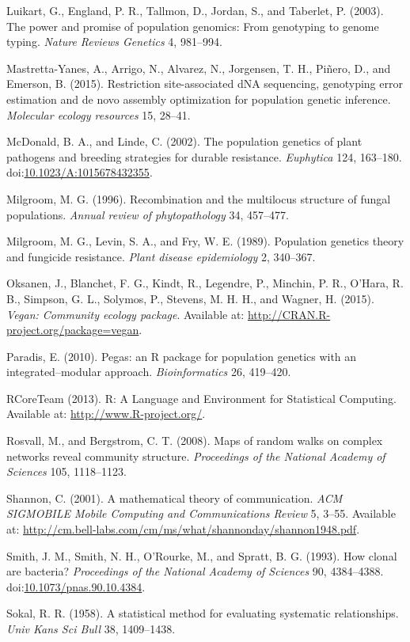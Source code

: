 \documentclass{frontiersSCNS} %
\begin{document}
Luikart, G., England, P. R., Tallmon, D., Jordan, S., and Taberlet, P.
(2003). The power and promise of population genomics: From genotyping to
genome typing. \emph{Nature Reviews Genetics} 4, 981--994.

Mastretta-Yanes, A., Arrigo, N., Alvarez, N., Jorgensen, T. H.,
Pi{ñ}ero, D., and Emerson, B. (2015). Restriction site-associated dNA
sequencing, genotyping error estimation and de novo assembly
optimization for population genetic inference. \emph{Molecular ecology
resources} 15, 28--41.

McDonald, B. A., and Linde, C. (2002). The population genetics of plant
pathogens and breeding strategies for durable resistance.
\emph{Euphytica} 124, 163--180.
doi:\href{http://dx.doi.org/10.1023/A:1015678432355}{10.1023/A:1015678432355}.

Milgroom, M. G. (1996). Recombination and the multilocus structure of
fungal populations. \emph{Annual review of phytopathology} 34, 457--477.

Milgroom, M. G., Levin, S. A., and Fry, W. E. (1989). Population
genetics theory and fungicide resistance. \emph{Plant disease
epidemiology} 2, 340--367.

Oksanen, J., Blanchet, F. G., Kindt, R., Legendre, P., Minchin, P. R.,
O'Hara, R. B., Simpson, G. L., Solymos, P., Stevens, M. H. H., and
Wagner, H. (2015). \emph{Vegan: Community ecology package}. Available
at: \url{http://CRAN.R-project.org/package=vegan}.

Paradis, E. (2010). Pegas: an R package for population genetics with an
integrated--modular approach. \emph{Bioinformatics} 26, 419--420.

RCoreTeam (2013). R: A Language and Environment for Statistical
Computing. Available at: \url{http://www.R-project.org/}.

Rosvall, M., and Bergstrom, C. T. (2008). Maps of random walks on
complex networks reveal community structure. \emph{Proceedings of the
National Academy of Sciences} 105, 1118--1123.

Shannon, C. (2001). A mathematical theory of communication. \emph{ACM
SIGMOBILE Mobile Computing and Communications Review} 5, 3--55.
Available at:
\url{http://cm.bell-labs.com/cm/ms/what/shannonday/shannon1948.pdf}.

Smith, J. M., Smith, N. H., O'Rourke, M., and Spratt, B. G. (1993). How
clonal are bacteria? \emph{Proceedings of the National Academy of
Sciences} 90, 4384--4388.
doi:\href{http://dx.doi.org/10.1073/pnas.90.10.4384}{10.1073/pnas.90.10.4384}.

Sokal, R. R. (1958). A statistical method for evaluating systematic
relationships. \emph{Univ Kans Sci Bull} 38, 1409--1438.
\end{document}
